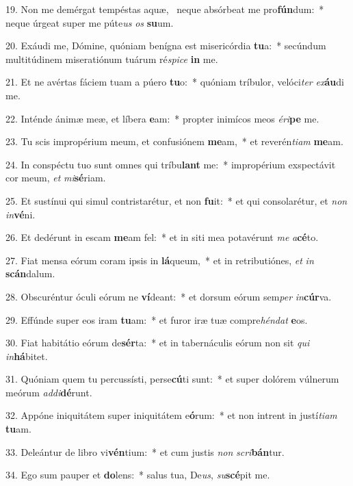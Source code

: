 19. Non me demérgat tempéstas aquæ, \dag\  neque absórbeat me pro\textbf{fún}dum:~*  neque úrgeat super me púte\textit{us} \textit{os} \textbf{su}um.\

20. Exáudi me, Dómine, quóniam benígna est misericórdia \textbf{tu}a:~*  secúndum multitúdinem miseratiónum tuárum ré\textit{spi}\textit{ce} \textbf{in} me.\

21. Et ne avértas fáciem tuam a púero \textbf{tu}o:~*  quóniam tríbulor, velóci\textit{ter} \textit{ex}\textbf{áu}di me.\

22. Inténde ánimæ meæ, et líbera \textbf{e}am:~*  propter inimícos meos \textit{é}\textit{ri}\textbf{pe} me.\

23. Tu scis impropérium meum, et confusiónem \textbf{me}am,~*  et reverén\textit{ti}\textit{am} \textbf{me}am.\

24. In conspéctu tuo sunt omnes qui tríbu\textbf{lant} me:~*  impropérium exspectávit cor meum, \textit{et} \textit{mi}\textbf{sé}riam.\

25. Et sustínui qui simul contristarétur, et non \textbf{fu}it:~*  et qui consolarétur, et \textit{non} \textit{in}\textbf{vé}ni.\

26. Et dedérunt in escam \textbf{me}am fel:~*  et in siti mea potavérunt \textit{me} \textit{a}\textbf{cé}to.\

27. Fiat mensa eórum coram ipsis in \textbf{lá}queum,~*  et in retributiónes, \textit{et} \textit{in} \textbf{scán}dalum.\

28. Obscuréntur óculi eórum ne \textbf{ví}deant:~*  et dorsum eórum sem\textit{per} \textit{in}\textbf{cúr}va.\

29. Effúnde super eos iram \textbf{tu}am:~*  et furor iræ tuæ compre\textit{hén}\textit{dat} \textbf{e}os.\

30. Fiat habitátio eórum de\textbf{sér}ta:~*  et in tabernáculis eórum non sit \textit{qui} \textit{in}\textbf{há}bitet.\

31. Quóniam quem tu percussísti, perse\textbf{cú}ti sunt:~*  et super dolórem vúlnerum meórum \textit{ad}\textit{di}\textbf{dé}runt.\

32. Appóne iniquitátem super iniquitátem e\textbf{ó}rum:~*  et non intrent in justí\textit{ti}\textit{am} \textbf{tu}am.\

33. Deleántur de libro vi\textbf{vén}tium:~*  et cum justis \textit{non} \textit{scri}\textbf{bán}tur.\

34. Ego sum pauper et \textbf{do}lens:~*  salus tua, De\textit{us}, \textit{su}\textbf{scé}pit me.\

